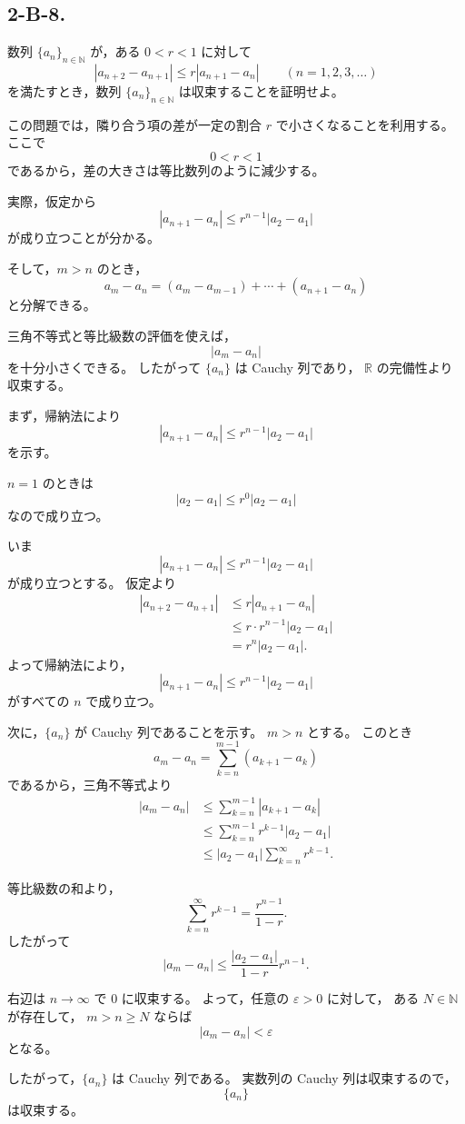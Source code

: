 \subsection{2-B-8.}
\begin{exercise}
	数列 \(\{a_n\}_{n\in\mathbb{N}}\) が，ある \(0<r<1\) に対して
	\[
	|a_{n+2}-a_{n+1}|
	\leq
	r|a_{n+1}-a_n|
	\qquad
	(n=1,2,3,\ldots)
	\]
	を満たすとき，数列 \(\{a_n\}_{n\in\mathbb{N}}\) は収束することを証明せよ。
\end{exercise}

\begin{background}
	この問題では，隣り合う項の差が一定の割合 \(r\) で小さくなることを利用する。
	ここで
	\[
	0<r<1
	\]
	であるから，差の大きさは等比数列のように減少する。
	
	実際，仮定から
	\[
	|a_{n+1}-a_n|
	\leq
	r^{n-1}|a_2-a_1|
	\]
	が成り立つことが分かる。
	
	そして，\(m>n\) のとき，
	\[
	a_m-a_n
	=
	(a_m-a_{m-1})
	+\cdots+
	(a_{n+1}-a_n)
	\]
	と分解できる。
	
	三角不等式と等比級数の評価を使えば，
	\[
	|a_m-a_n|
	\]
	を十分小さくできる。
	したがって \(\{a_n\}\) は Cauchy 列であり，
	\(\mathbb{R}\) の完備性より収束する。
\end{background}

\begin{strategy}
	まず，帰納法により
	\[
	|a_{n+1}-a_n|
	\leq
	r^{n-1}|a_2-a_1|
	\]
	を示す。
	
	\(n=1\) のときは
	\[
	|a_2-a_1|
	\leq
	r^0|a_2-a_1|
	\]
	なので成り立つ。
	
	いま
	\[
	|a_{n+1}-a_n|
	\leq
	r^{n-1}|a_2-a_1|
	\]
	が成り立つとする。
	仮定より
	\[
	\begin{aligned}
		|a_{n+2}-a_{n+1}|
		&\leq
		r|a_{n+1}-a_n| \\
		&\leq
		r\cdot r^{n-1}|a_2-a_1| \\
		&=
		r^n|a_2-a_1|.
	\end{aligned}
	\]
	よって帰納法により，
	\[
	|a_{n+1}-a_n|
	\leq
	r^{n-1}|a_2-a_1|
	\]
	がすべての \(n\) で成り立つ。
	
	次に，\(\{a_n\}\) が Cauchy 列であることを示す。
	\(m>n\) とする。
	このとき
	\[
	a_m-a_n
	=
	\sum_{k=n}^{m-1}(a_{k+1}-a_k)
	\]
	であるから，三角不等式より
	\[
	\begin{aligned}
		|a_m-a_n|
		&\leq
		\sum_{k=n}^{m-1}|a_{k+1}-a_k| \\
		&\leq
		\sum_{k=n}^{m-1}
		r^{k-1}|a_2-a_1| \\
		&\leq
		|a_2-a_1|
		\sum_{k=n}^{\infty}r^{k-1}.
	\end{aligned}
	\]
	
	等比級数の和より，
	\[
	\sum_{k=n}^{\infty}r^{k-1}
	=
	\frac{r^{n-1}}{1-r}.
	\]
	したがって
	\[
	|a_m-a_n|
	\leq
	\frac{|a_2-a_1|}{1-r}r^{n-1}.
	\]
	
	右辺は \(n\to\infty\) で \(0\) に収束する。
	よって，任意の \(\varepsilon>0\) に対して，
	ある \(N\in\mathbb{N}\) が存在して，
	\(m>n\geq N\) ならば
	\[
	|a_m-a_n|<\varepsilon
	\]
	となる。
	
	したがって，\(\{a_n\}\) は Cauchy 列である。
	実数列の Cauchy 列は収束するので，
	\[
	\{a_n\}
	\]
	は収束する。
\end{strategy}